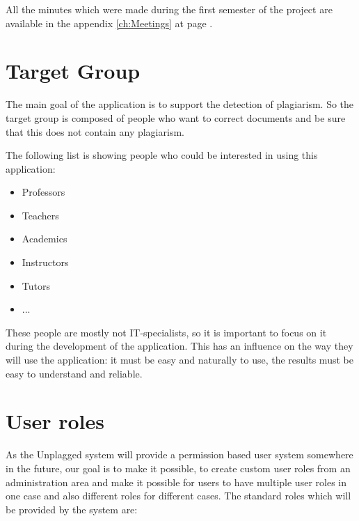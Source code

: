 All the minutes which were made during the first semester of the project are available in the appendix \ref{ch:Meetings} 
at page \pageref{ch:Meetings}.

\section{Target Group}

The main goal of the application is to support the detection of plagiarism. So the target group is composed of people 
who want to correct documents and be sure that this does not contain any plagiarism.

The following list is showing people who could be interested in using this application:

\begin{itemize}
\item Professors 
\item Teachers
\item Academics
\item Instructors
\item Tutors
\item ...
\end{itemize}

These people are mostly not IT-specialists, so it is important to focus on it during the development of the application. This has an influence on the way they will use the application: it must be easy and naturally to use, the results must be easy to understand and reliable.

\section{User roles}

As the Unplagged system will provide a permission based user system somewhere in the future, our goal is to make it 
possible, to create custom 
user roles from an administration area and make it possible for users to have multiple user roles in one case and also 
different roles for different cases.
The standard roles which will be provided by the system are:

